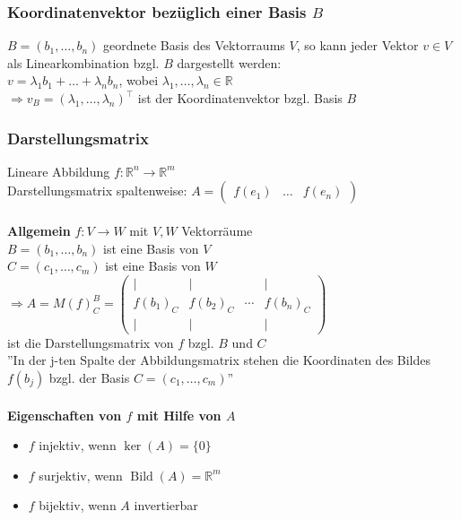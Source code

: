 \documentclass[6pt,a4paper]{scrartcl}
\DeclareMathOperator{\Bild}{Bild}
\begin{document}
\begin{multicols*}{4}
\subsubsection{Koordinatenvektor bezüglich einer Basis $B$}
$B=(b_1,\dots,b_n)$ geordnete Basis des Vektorraums $V$, so kann jeder Vektor $v\in V$ als Linearkombination bzgl. $B$ dargestellt werden: \\
$v=\lambda_1b_1+\dots+\lambda_nb_n$, wobei $\lambda_1,\dots,\lambda_n\in \mathbb{R}$\\
$\Rightarrow v_B=(\lambda_1, \dots ,\lambda_n)^\top$ ist der Koordinatenvektor bzgl. Basis $B$
\subsubsection{Darstellungsmatrix}
Lineare Abbildung $f:\mathbb{R}^n \rightarrow \mathbb{R}^m$ \\
Darstellungsmatrix spaltenweise:
$A=\begin{pmatrix}f(e_1) & \dots & f(e_n)
\end{pmatrix} $ \\ \\
\textbf{Allgemein} $f:V\rightarrow W$ mit $V, W$ Vektorräume \\
$B=(b_1,\dots,b_n)$ ist eine Basis von $V$ \\
$C=(c_1,\dots,c_m)$ ist eine Basis von $W$ \\
$\Rightarrow A=M(f)_C^B = \begin{pmatrix}
\vert & \vert &  & \vert \\
f(b_1)_C & f(b_2)_C & \cdots & f(b_n)_C\\
\vert & \vert &  & \vert
\end{pmatrix}$ \\
ist die Darstellungsmatrix von $f$ bzgl. $B$ und $C$ \\
''In der j-ten Spalte der Abbildungsmatrix stehen die Koordinaten des Bildes $f(b_j)$ bzgl. der Basis $C=(c_1,\dots,c_m)$'' \\ \\
\textbf{Eigenschaften von $f$ mit Hilfe von $A$}
\begin{itemize}\itemsep0pt
\item $f$ injektiv, wenn $\ker(A)=\{0\}$
\item $f$ surjektiv, wenn $\Bild(A)=\mathbb{R}^m$
\item $f$ bijektiv, wenn $A$ invertierbar
\end{itemize}

\end{multicols*}
\end{document}
